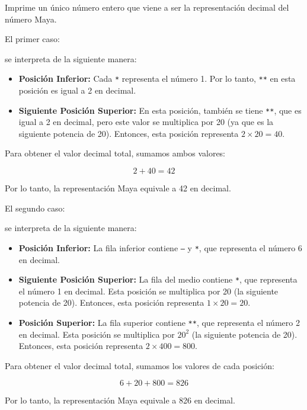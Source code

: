 \outputText

Imprime un único número entero que viene a ser la representaci\'on decimal del n\'umero Maya.

\exampleCases

\begin{example}
\end{example}

\explanationText

El primer caso:


se interpreta de la siguiente manera:

\begin{itemize}
    \item \textbf{Posición Inferior:} Cada \texttt{*} representa el número 1. Por lo tanto, \texttt{**} en esta posición es igual a 2 en decimal.
    \item \textbf{Siguiente Posición Superior:} En esta posición, también se tiene \texttt{**}, que es igual a 2 en decimal, pero este valor se multiplica por 20 (ya que es la siguiente potencia de 20). Entonces, esta posición representa $2 \times 20 = 40$.
\end{itemize}

Para obtener el valor decimal total, sumamos ambos valores:

\[
2 + 40 = 42
\]

Por lo tanto, la representación Maya equivale a 42 en decimal.

\newpage
El segundo caso:


se interpreta de la siguiente manera:

\begin{itemize}
    \item \textbf{Posición Inferior:} La fila inferior contiene \texttt{---} y \texttt{*}, que representa el número 6 en decimal.
    \item \textbf{Siguiente Posición Superior:} La fila del medio contiene \texttt{*}, que representa el número 1 en decimal. Esta posición se multiplica por 20 (la siguiente potencia de 20). Entonces, esta posición representa $1 \times 20 = 20$.
    \item \textbf{Posición Superior:} La fila superior contiene \texttt{**}, que representa el número 2 en decimal. Esta posición se multiplica por $20^2$ (la siguiente potencia de 20). Entonces, esta posición representa 
    $2 \times 400 = 800$.
\end{itemize}

Para obtener el valor decimal total, sumamos los valores de cada posición:

\[
6 + 20 + 800 = 826
\]

Por lo tanto, la representación Maya equivale a 826 en decimal.
